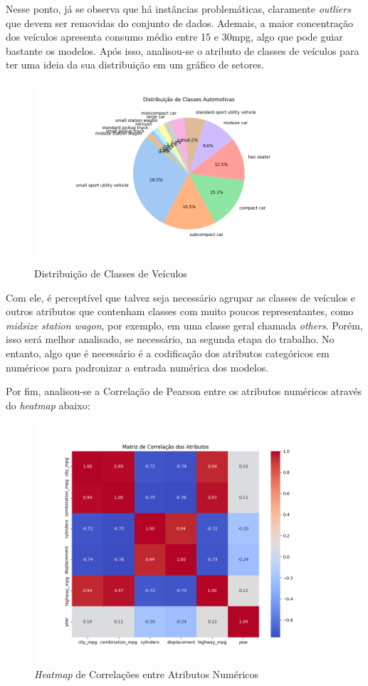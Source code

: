 \documentclass{report}
\begin{document}
Nesse ponto, já se observa que há instâncias problemáticas, claramente \textit{outliers} que devem ser removidas do conjunto de dados. Ademais, a maior concentração dos veículos
apresenta consumo médio entre 15 e 30mpg, algo que pode guiar bastante os modelos. Após isso, analisou-se o atributo de classes de veículos para ter uma ideia da sua distribuição
em um gráfico de setores.

\begin{figure}[h!]
  \centering
  \includegraphics[width=.85\linewidth]{images/plots/pie_charts/pure_car_classes.png}
  \caption{\label{img:classes_dist} Distribuição de Classes de Veículos}
\end{figure}

Com ele, é perceptível que talvez seja necessário agrupar as classes de veículos e outros atributos que contenham classes com muito poucos representantes, como \textit{midsize station wagon},
por exemplo, em uma classe geral chamada \textit{others}. Porém, isso será melhor analisado, se necessário, na segunda etapa do trabalho. No entanto, algo que é necessário é a codificação dos
atributos categóricos em numéricos para padronizar a entrada numérica dos modelos.

Por fim, analisou-se a Correlação de Pearson entre os atributos numéricos através do \textit{heatmap} abaixo:

\begin{figure}[h!]
  \centering
  \includegraphics[width=.85\linewidth]{images/plots/heatmaps/numeric_atributes_correlation.png}
  \caption{\label{img:num_heatmat} \textit{Heatmap} de Correlações entre Atributos Numéricos}
\end{figure}
\end{document}
